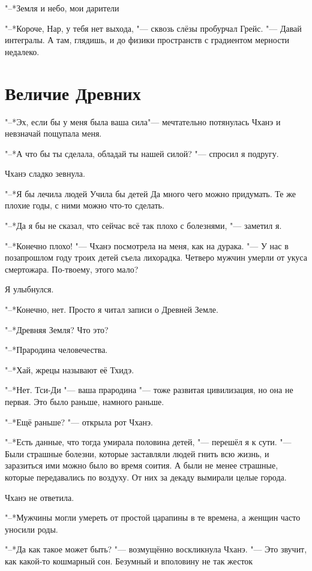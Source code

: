 \documentclass[a4paper,10pt,fleqn]{book}
\newcommand{\ldotst}{\so{...}\xspace}
\begin{document}
"--*Земля и небо, мои дарители\ldotst

"--*Короче, Нар, у тебя нет выхода, "--- сквозь слёзы пробурчал Грейс.
"--- Давай интегралы.
А там, глядишь, и до физики пространств с градиентом мерности недалеко.

\section {Величие Древних}

"--*Эх, если бы у меня была ваша сила\ldotst "--- мечтательно потянулась Чханэ и невзначай пощупала меня.

"--*А что бы ты сделала, обладай ты нашей силой? "--- спросил я подругу.

Чханэ сладко зевнула.

"--*Я бы лечила людей\ldotst Учила бы детей\ldotst Да много чего можно придумать.
Те же плохие годы, с ними можно что-то сделать.

"--*Да я бы не сказал, что сейчас всё так плохо с болезнями, "--- заметил я.

"--*Конечно плохо! "--- Чханэ посмотрела на меня, как на дурака.
"--- У нас в позапрошлом году троих детей съела лихорадка.
Четверо мужчин умерли от укуса смертожара.
По-твоему, этого мало?

Я улыбнулся.

"--*Конечно, нет.
Просто я читал записи о Древней Земле.

"--*Древняя Земля?
Что это?

"--*Прародина человечества.

"--*Хай, жрецы называют её Тхидэ.

"--*Нет.
Тси-Ди "--- ваша прародина "--- тоже развитая цивилизация, но она не первая.
Это было раньше, намного раньше.

"--*Ещё раньше? "--- открыла рот Чханэ.

"--*Есть данные, что тогда умирала половина детей, "--- перешёл я к сути.
"--- Были страшные болезни, которые заставляли людей гнить всю жизнь, и заразиться ими можно было во время соития.
А были не менее страшные, которые передавались по воздуху.
От них за декаду вымирали целые города.

Чханэ не ответила.

"--*Мужчины могли умереть от простой царапины в те времена, а женщин часто уносили роды.

"--*Да как такое может быть? "--- возмущённо воскликнула Чханэ.
"--- Это звучит, как какой-то кошмарный сон.
Безумный и вполовину не так жесток\ldotst
\end{document}
